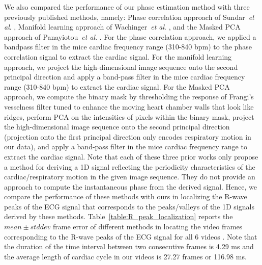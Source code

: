 \documentclass[journal]{IEEEtran}
\newcommand{\etal}{~\textit{et al}. }
\newcommand{\rk}[1]{{\color{blue}{#1}}}
\begin{document}
We also compared the performance of our phase estimation method with three previously published methods, namely: Phase correlation approach of Sundar\etal\cite{Sundar2009}, Manifold learning approach of Wachinger\etal\cite{Wachinger2012}, and the Masked PCA approach of Panayiotou\etal\cite{Panayiotou2014}. For the phase correlation approach, we applied a bandpass filter in the mice cardiac frequency range (310-840 bpm) to the phase correlation signal to extract the cardiac signal. For the manifold learning approach, we project the high-dimensional image sequence onto the second principal direction and apply a band-pass filter in the mice cardiac frequency range (310-840 bpm) to extract the cardiac signal. For the Masked PCA approach, we compute the binary mask by thresholding the response of Frangi's vesselness filter tuned to enhance the moving heart chamber walls that look like ridges, perform PCA on the intensities of pixels within the binary mask,  project the high-dimensional image sequence onto the second principal direction (projection onto the first principal direction only encodes respiratory motion in our data), and apply a band-pass filter in the mice cardiac frequency range to extract the cardiac signal. Note that each of these three prior works only propose a method for deriving a 1D signal reflecting the periodicity characteristics of the cardiac/respiratory motion in the given image sequence. They do not provide an approach to compute the instantaneous phase from the derived signal. Hence, we compare the performance of these methods with ours in localizing the R-wave peaks of the ECG signal that corresponds to the peaks/valleys of the 1D signals derived by these methods. Table~\ref{table:R_peak_localization} reports the $mean \pm stddev$ frame error of different methods in locating the video frames corresponding to the R-wave peaks of the ECG signal for all 6 videos \rk{where in the result of the best performing method for each video is highlighted in bold}. Note that the duration of the time interval between two consecutive frames is 4.29 ms and the average length of cardiac cycle in our videos is 27.27 frames or 116.98 ms.
	
\end{document}
